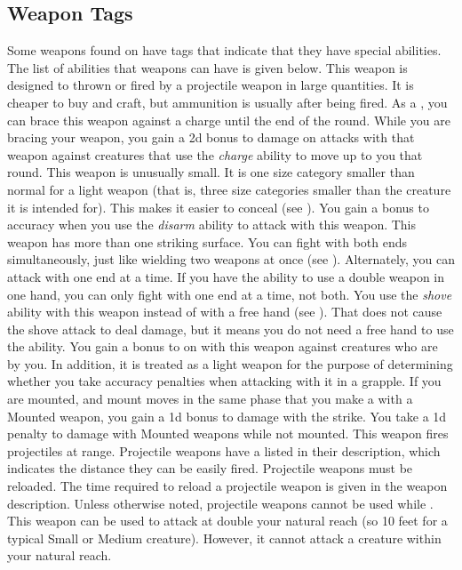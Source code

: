     \subsection{Weapon Tags}\label{Weapon Tags}
        Some weapons found on  have tags that indicate that they have special abilities. The list of abilities that weapons can have is given below.
         This weapon is designed to thrown or fired by a projectile weapon in large quantities. It is cheaper to buy and craft, but ammunition is usually  after being fired.
         As a , you can brace this weapon against a charge until the end of the round.
        While you are bracing your weapon, you gain a \plus2d bonus to damage on attacks with that weapon against creatures that use the \textit{charge} ability to move up to you that round.
         This weapon is unusually small. It is one size category smaller than normal for a light weapon (that is, three size categories smaller than the creature it is intended for). This makes it easier to conceal (see ).
         You gain a  bonus to accuracy when you use the \textit{disarm} ability to attack with this weapon.
         This weapon has more than one striking surface. You can fight with both ends simultaneously, just like wielding two weapons at once (see ). Alternately, you can attack with one end at a time. If you have the ability to use a double weapon in one hand, you can only fight with one end at a time, not both.
         You use the \textit{shove} ability with this weapon instead of with a free hand (see ).
        That does not cause the shove attack to deal damage, but it means you do not need a free hand to use the ability.
         You gain a  bonus to  on  with this weapon against creatures who are  by you.
        In addition, it is treated as a light weapon for the purpose of determining whether you take accuracy penalties when attacking with it in a grapple.
        \label{Mounted Weapon} If you are mounted, and mount moves in the same phase that you make a  with a Mounted weapon, you gain a \plus1d bonus to damage with the strike.
        You take a \minus1d penalty to damage with Mounted weapons while not mounted.
         This weapon fires projectiles at range. Projectile weapons have a  listed in their description, which indicates the distance they can be easily fired. Projectile weapons must be reloaded. The time required to reload a projectile weapon is given in the weapon description.
        Unless otherwise noted, projectile weapons cannot be used while \prone.
        \label{Reach Weapon} This weapon can be used to attack at double your natural reach (so 10 feet for a typical Small or Medium creature). However, it cannot attack a creature within your natural reach.

